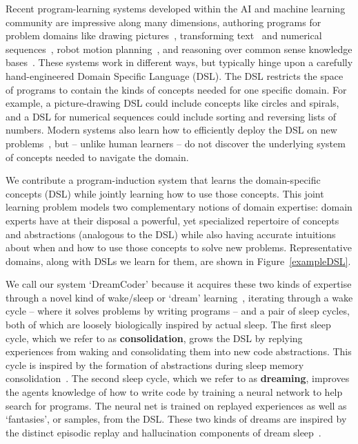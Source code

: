 \documentclass{article}
\begin{document}
Recent program-learning systems developed within the AI and machine
learning community are impressive along many dimensions, authoring
programs for problem domains like drawing
pictures~\cite{spiral,ellis2017learning}, transforming
text~\cite{gulwani2011automating} and numerical
sequences~\cite{balog2016deepcoder}, robot motion
planning~\cite{devlin2017neural}, and reasoning over common sense
knowledge bases~\cite{muggleton2015meta}.  These systems work in
different ways, but typically hinge upon a carefully hand-engineered
Domain Specific Language (DSL).  The DSL restricts the space of
programs to contain the kinds of concepts needed for one specific
domain.  For example, a picture-drawing DSL could include concepts
like circles and spirals, and a DSL for numerical sequences could
include sorting and reversing lists of numbers.  Modern systems also
learn how to efficiently deploy the DSL on new
problems~\cite{devlin2017robustfill,balog2016deepcoder,NGDS}, but --
unlike human learners -- do not discover the underlying system of
concepts needed to navigate the domain.

We contribute a program-induction system that learns the
domain-specific concepts (DSL) while jointly learning how to use those
concepts.  This joint learning problem models two complementary
notions of domain expertise: domain experts have at their disposal
a powerful, yet specialized repertoire of concepts and abstractions
(analogous to the DSL) while also having accurate intuitions about
when and how to use those concepts to solve new problems.
Representative domains,
along with DSLs we learn for them,
are shown in Figure~\ref{exampleDSL}.

We call our system `DreamCoder' because it acquires these two kinds of
expertise through a novel kind of wake/sleep or `dream'
learning~\cite{hinton1995wake}, iterating through a wake cycle --
where it solves problems by writing programs -- and a pair of sleep
cycles, both of which are loosely biologically inspired by actual
sleep.  The first sleep cycle, which we refer to as
\textbf{consolidation}, grows the DSL by replying experiences from
waking and consolidating them into new code abstractions.  This cycle
is inspired by the formation of abstractions during sleep memory
consolidation~\cite{DUDAI201520}.  The second sleep cycle, which we
refer to as \textbf{dreaming}, improves the agents knowledge of how to
write code by training a neural network to help search for
programs. The neural net is trained on replayed experiences as well as
`fantasies', or samples, from the DSL.  These two kinds of dreams are
inspired by the distinct episodic replay and hallucination components
of dream sleep~\cite{fosse2003dreaming}.
\end{document}
